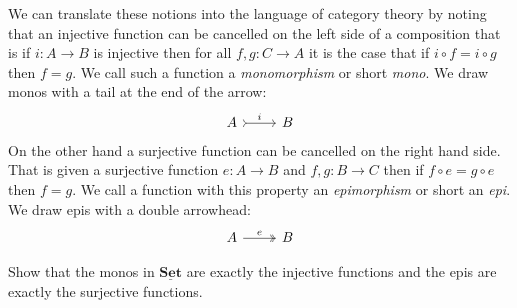 \documentclass{article}
\newcommand{\Prop}{\mathbf{Prop}}
\newcommand{\Set}{\mathbf{Set}}
\newcommand{\cat}[1]{\underline{\mathbf{#1}}}
\begin{document}
We can translate these notions into the language of category theory by noting that an injective function can be cancelled on the left side of a composition that is if $i : A \to B$ is injective then for all $f,g : C \to A$ it is the case  that if $i \circ f = i \circ g$ then $f = g$. We call such a function a \emph{monomorphism} or short \emph{mono}. We draw monos with a tail at the end of the arrow:
\[\begin{tikzcd}
A \arrow[r,rightarrowtail,"i"]  & B
\end{tikzcd} 
\]
On the other hand a surjective function can be cancelled on the right hand side. That is given a surjective function $e : A \to B$ and $f,g : B \to C$ then if $f \circ e = g \circ e$ then $f = g$. We call a function with this property an\emph{ epimorphism} or short an \emph{epi}. We draw epis with a double arrowhead:
\[\begin{tikzcd}
A \arrow[r,twoheadrightarrow,"e"]  & B
\end{tikzcd}
\]
\begin{Exercise}
  Show that the monos in $\cat{Set}$ are exactly the injective functions and the epis are exactly the surjective functions.
\end{Exercise}
\end{document}
